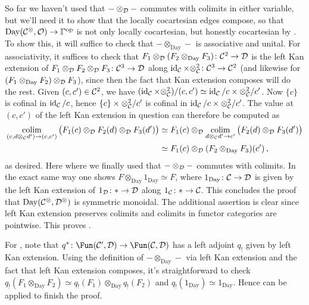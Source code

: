 \begin{proof*}
	So far we haven't used that $-\otimes_{\mathcal{D}}-$ commutes with colimits in either variable, but we'll need it to show that the locally cocartesian edges compose, so that $\operatorname{Day}(\Cc^\otimes,\Oo)\morphism\IGamma^\op$ is not only locally cocartesian, but honestly cocartesian by \cite[Proposition~IX.13]{HigherCatsII}. To show this, it will suffice to check that $-\otimes_{\operatorname{Day}}-$ is associative and unital. For associativity, it suffices to check that $F_1\otimes_\Dd (F_2\otimes_{\operatorname{Day}} F_3)\colon \Cc^2\morphism \Dd$ is the left Kan extension of $F_1\otimes_\Dd F_2\otimes_\Dd F_3\colon \Cc^3\morphism \Dd$ along $\id_\Cc\times \otimes_\Cc^2\colon \Cc^3\morphism\Cc^2$ (and likewise for $(F_1\otimes_{\operatorname{Day}} F_2)\otimes_{\mathcal{D}} F_3$), since then the fact that Kan extension composes will do the rest. Given $(c,c')\in \mathcal{C}^2$, we have $(\operatorname{id}_{\mathcal{C}}\times \otimes_{\mathcal{C}}^2)/(c,c')\simeq \operatorname{id}_{\mathcal{C}}/c\times \otimes_{\mathcal{C}}^2/c'$. Now $\{c\}$ is cofinal in $\operatorname{id}_{\mathcal{C}}/c$, hence $\{c\}\times \otimes_{\mathcal{C}}^2/c'$ is cofinal in $\operatorname{id}_{\mathcal{C}}/c\times \otimes_{\mathcal{C}}^2/c'$. The value at $(c,c')$ of the left Kan extension in question can therefore be computed as
	\begin{align*}
		\colimit_{(c,d\otimes_\Cc d')\morphism (c,c')}\big( F_1(c)\otimes_\Dd F_2(d)\otimes_\Dd F_3(d')\big)&\simeq F_1(c)\otimes_\Dd \colimit_{d\otimes_\Cc d'\morphism c'}\big(F_2(d)\otimes_\Dd F_3(d')\big)\\
		&\simeq F_1(c)\otimes_\Dd (F_2\otimes_{\operatorname{Day}}F_3)(c')\,,
	\end{align*}
	as desired. Here where we finally used that $-\otimes_{\mathcal{D}}-$ commutes with colimits. In the exact same way one shows $F\otimes_{\operatorname{Day}}1_{\operatorname{Day}}\simeq F$, where $1_{\operatorname{Day}}\colon \Cc\morphism\Dd$ is given by the left Kan extension of $1_\Dd\colon *\morphism \Dd$ along $1_\Cc\colon *\morphism\Cc$. This concludes the proof that $\operatorname{Day}(\mathcal{C}^\otimes,\mathcal{D}^\otimes)$ is symmetric monoidal. The additional assertion is clear since left Kan extension preserves colimits and colimits in functor categories are pointwise. This proves .
	
	For , note that $q^*\colon \Fun(\Cc',\Dd)\morphism \Fun(\Cc,\Dd)$ has a left adjoint $q_!$ given by left Kan extension. Using the definition of $-\otimes_{\operatorname{Day}}-$ via left Kan extension and the fact that left Kan extension composes, it's straightforward to check $q_!(F_1\otimes_{\operatorname{Day}}F_2)\simeq q_!(F_1)\otimes_{\operatorname{Day}} q_!(F_2)$ and $q_!(1_{\operatorname{Day}})\simeq 1_{\operatorname{Day}}$. Hence  can be applied to finish the proof.
\end{proof*}
